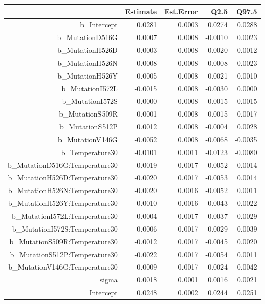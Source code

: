 \begin{table}[ht]
\centering
\begin{tabular}{rrrrr}
  \hline
 & Estimate & Est.Error & Q2.5 & Q97.5 \\ 
  \hline
b\_Intercept & 0.0281 & 0.0003 & 0.0274 & 0.0288 \\ 
  b\_MutationD516G & 0.0007 & 0.0008 & -0.0010 & 0.0023 \\ 
  b\_MutationH526D & -0.0003 & 0.0008 & -0.0020 & 0.0012 \\ 
  b\_MutationH526N & 0.0008 & 0.0008 & -0.0008 & 0.0023 \\ 
  b\_MutationH526Y & -0.0005 & 0.0008 & -0.0021 & 0.0010 \\ 
  b\_MutationI572L & -0.0015 & 0.0008 & -0.0030 & 0.0000 \\ 
  b\_MutationI572S & -0.0000 & 0.0008 & -0.0015 & 0.0015 \\ 
  b\_MutationS509R & 0.0001 & 0.0008 & -0.0015 & 0.0017 \\ 
  b\_MutationS512P & 0.0012 & 0.0008 & -0.0004 & 0.0028 \\ 
  b\_MutationV146G & -0.0052 & 0.0008 & -0.0068 & -0.0035 \\ 
  b\_Temperature30 & -0.0101 & 0.0011 & -0.0123 & -0.0080 \\ 
  b\_MutationD516G:Temperature30 & -0.0019 & 0.0017 & -0.0052 & 0.0014 \\ 
  b\_MutationH526D:Temperature30 & -0.0020 & 0.0017 & -0.0053 & 0.0014 \\ 
  b\_MutationH526N:Temperature30 & -0.0020 & 0.0016 & -0.0052 & 0.0011 \\ 
  b\_MutationH526Y:Temperature30 & -0.0010 & 0.0016 & -0.0043 & 0.0022 \\ 
  b\_MutationI572L:Temperature30 & -0.0004 & 0.0017 & -0.0037 & 0.0029 \\ 
  b\_MutationI572S:Temperature30 & 0.0006 & 0.0017 & -0.0029 & 0.0039 \\ 
  b\_MutationS509R:Temperature30 & -0.0012 & 0.0017 & -0.0045 & 0.0020 \\ 
  b\_MutationS512P:Temperature30 & -0.0022 & 0.0017 & -0.0054 & 0.0011 \\ 
  b\_MutationV146G:Temperature30 & 0.0009 & 0.0017 & -0.0024 & 0.0042 \\ 
  sigma & 0.0018 & 0.0001 & 0.0016 & 0.0021 \\ 
  Intercept & 0.0248 & 0.0002 & 0.0244 & 0.0251 \\ 

\end{tabular}
\end{table}
